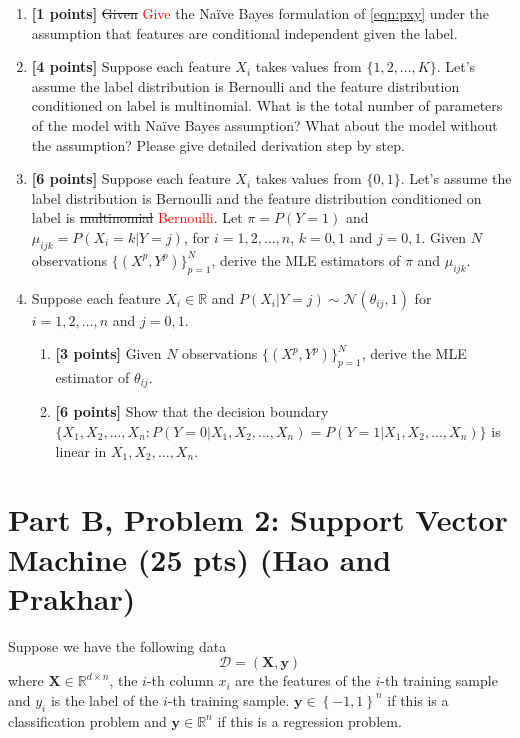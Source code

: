 \documentclass{article}
\begin{document}
\begin{enumerate}
\item\textbf{[1 points]}  \sout{Given} \textcolor{red}{Give} the Na{\"i}ve Bayes formulation of \eqref{eqn:pxy} under the assumption that features are conditional independent given the label.
\item\textbf{[4 points]} Suppose each feature $X_i$ takes values from $\{1,2,...,K\}$. Let's assume the label distribution is Bernoulli and the feature distribution conditioned on label is multinomial. What is the total number of parameters of the model with Na{\"i}ve Bayes assumption? What about the model without the assumption? Please give detailed derivation step by step.
\item\textbf{[6 points]} Suppose each feature $X_i$ takes values from $\{0,1\}$. Let's assume the label distribution is Bernoulli and the feature distribution conditioned on label is \sout{multinomial} \textcolor{red}{Bernoulli}. Let $\pi = P(Y=1)$ and $\mu_{ijk}=P(X_i=k|Y=j)$, for $i=1,2,...,n$, $k=0,1$ and $j=0,1$. Given $N$ observations $\{(X^{p},Y^{p})\}_{p=1}^N$, derive the MLE estimators of $\pi$ and $\mu_{ijk}$.
\item Suppose each feature $X_i\in\mathbb{R}$ and  $P(X_i|Y=j)\sim \mathcal{N}(\theta_{ij}, 1)$ for $i=1,2,...,n$ and $j=0,1$.
\begin{enumerate}
\item\textbf{[3 points]} Given $N$ observations $\{(X^{p},Y^{p})\}_{p=1}^N$, derive the MLE estimator of $\theta_{ij}$.
\item\textbf{[6 points]} Show that the decision boundary $\{X_1,X_2,...,X_n: P(Y=0|X_1,X_2,...,X_n) = P(Y=1|X_1,X_2,...,X_n)\}$ is linear in $X_1,X_2,...,X_n$.
\end{enumerate}

\end{enumerate}


\newpage


\section*{Part B, Problem 2: Support Vector Machine (25 pts) (Hao and Prakhar)}
Suppose we have the following data $$\mathcal{D} = (\mathbf{X},\mathbf{y})$$ where $\mathbf{X} \in \mathbb{R}^{d \times n}$, the $i$-th column $x_i$ are the features of the $i$-th training sample and $y_i$ is the label of the $i$-th training sample.
$\mathbf{y} \in \left\{-1,1\right\}^n$ if this is a classification problem and $\mathbf{y} \in \mathbb{R}^n$ if this is a regression problem.
\end{document}
